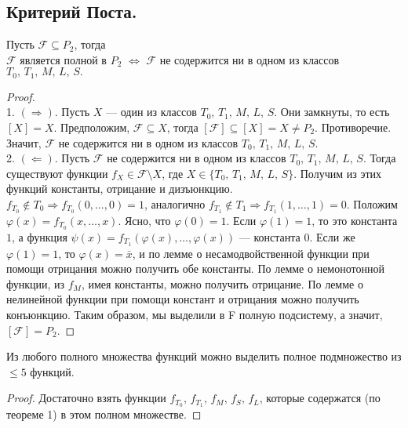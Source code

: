 \subsection{Критерий Поста.}
\begin{theorem} Пусть $\mathcal{F} \subseteq P_2$, тогда \\ $\mathcal{F}$ является полной в $P_2$ $\Longleftrightarrow$ $\mathcal{F}$ не содержится ни в одном из классов $ T_0,\, T_1,\,M,\,L,\,S.$
\end{theorem}
\begin{proof}
~\\
1. $(\Rightarrow)$. Пусть $X$ --- один из классов $ T_0,\, T_1,\,M,\,L,\,S$. Они замкнуты, то есть $[X] = X$.
Предположим, $\mathcal{F} \subseteq X $, тогда $[\mathcal{F}] \subseteq [X] = X \neq P_2 $. Противоречие. Значит, $\mathcal{F}$ не содержится ни в одном из классов $ T_0,\, T_1,\,M,\,L,\,S.$
~\\
2. $(\Leftarrow)$. Пусть $\mathcal{F}$ не содержится ни в одном из классов $ T_0,\, T_1,\,M,\,L,\,S$. Тогда существуют функции $f_X \in \mathcal{F} \setminus X$, где $X \in \{T_0,\, T_1,\,M,\,L,\,S\}$. Получим из этих функций константы, отрицание и дизъюнкцию. \\
$f_{T_0} \not\in T_0 \Rightarrow f_{T_0} (0,\ldots,0) = 1 $, аналогично $f_{T_1} \not\in T_1 \Rightarrow f_{T_1} (1,\ldots,1) = 0 $. Положим $\varphi (x) = f_{T_0}(x,\ldots,x)$. Ясно, что $\varphi (0) = 1$. Если $\varphi(1) = 1$, то это константа $1$,  а функция $\psi (x) = f_{T_1}(\varphi (x),\ldots,\varphi(x))$ --- константа $0$. Если же $\varphi(1) = 1$, то $\varphi (x) = \bar{x}$, и по лемме о несамодвойственной функции при помощи отрицания можно получить обе константы. По лемме о немонотонной функции, из $f_M$, имея константы, можно получить отрицание. По лемме о нелинейной функции при помощи констант и отрицания можно получить конъюнкцию. Таким образом, мы выделили в F полную подсистему, а значит, $[\mathcal{F}] = P_2$. 
\end{proof}
\begin{corollary}
Из любого полного множества функций можно выделить полное подмножество из $\leq 5$ функций.
\end{corollary}
\begin{proof}
Достаточно взять функции $f_{T_0},\,f_{T_1},\,f_M,\,f_S,\,f_L$, которые содержатся (по теореме 1) в этом полном множестве.
\end{proof}